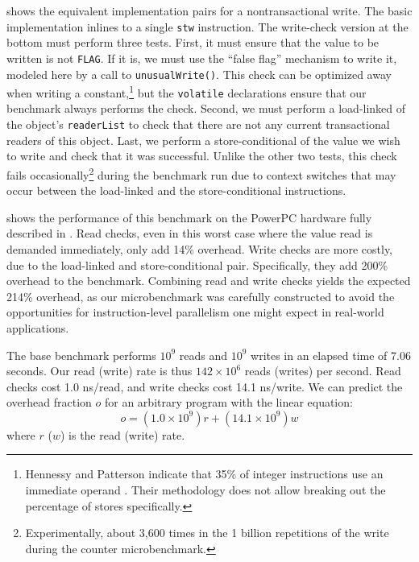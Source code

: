  shows the equivalent implementation pairs for a
nontransactional write.  The basic implementation inlines to a single
\texttt{stw} instruction.  The write-check version at the bottom must
perform three tests.  First, it must ensure that the value to be
written is not \texttt{FLAG}\@.  If it is, we must use the ``false flag''
mechanism to write it, modeled here by a call to
\texttt{unusualWrite()}.  This check can be optimized away when
writing a constant,\footnote{Hennessy and Patterson indicate that 35\%
  of integer instructions use an immediate operand \cite[p. 78]{HennessyPa96}.
  Their methodology does not
  allow breaking out the percentage of stores specifically.}
 but the \texttt{volatile} declarations ensure that
our benchmark always performs the check.  Second, we must perform
a load-linked of the object's \texttt{readerList} to check that there
are not any current transactional readers of this object.  Last, we
perform a store-conditional of the value we wish to write and check
that it was successful.  Unlike the other two tests, this check
fails occasionally\footnote{Experimentally, about 3,600 times in
  the 1 billion repetitions of the write during the counter microbenchmark.}
 during the benchmark run due to context switches
that may occur between the load-linked and the store-conditional
instructions.


 shows the performance of this benchmark on the
PowerPC hardware fully described in .
Read checks, even in this worst case where the value read is demanded
immediately, only add 14\% overhead.  Write checks are more costly,
due to the load-linked and store-conditional pair.  Specifically, they add 200\%
overhead to the benchmark.  Combining read and write checks yields the
expected 214\% overhead, as our microbenchmark was carefully constructed to
avoid the opportunities for instruction-level parallelism one might
expect in real-world applications.

The base benchmark performs $10^9$ reads and $10^9$ writes in an
elapsed time of 7.06 seconds.  Our read (write) rate is thus
$142\times 10^6$
reads (writes) per second.  Read checks cost 1.0 ns/read, and write
checks cost 14.1 ns/write.  We can predict the overhead fraction $o$
for an arbitrary program with the linear equation:
\begin{equation}\label{eqn:micro-perf}
o = (1.0\times 10^9) r + (14.1 \times 10^9) w
\end{equation}
where $r$ ($w$) is the read (write) rate.

